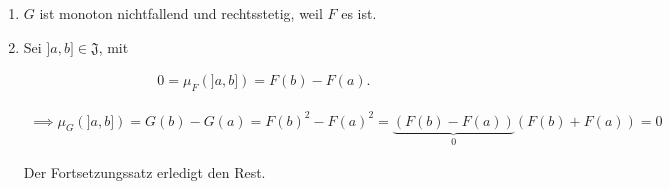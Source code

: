 \begin{solution}

\phantom{}

\begin{enumerate}[label = (\alph*)]

    \item $G$ ist monoton nichtfallend und rechtsstetig, weil $F$ es ist.
    
    \item Sei $]a, b] \in \mathfrak J$, mit
    
    \begin{align*}
        0 = \mu_F(]a, b]) = F(b) - F(a).
    \end{align*}

    \begin{align*}
        \implies
        \mu_G(]a, b])
        =
        G(b) - G(a)
        =
        F(b)^2 - F(a)^2
        =
        \underbrace{(F(b) - F(a))}_0 (F(b) + F(a))
        =
        0
    \end{align*}

    Der Fortsetzungssatz erledigt den Rest.
    
    \begin{comment}

        \item Sei $A \in \mathfrak B$ mit $\mu_F(A) = 0$.
        $\mu_F$ ist ein Lebesgue-Stieltjes-Maß, also sigmaendlich.

        \begin{align*}
            \implies &
            \mu_F(A)
            =
            \inf \Bbraces{\sum_{n \in \N} \mu_F(E_n): E_n \in \mathfrak J, A \subseteq \bigcup_{n \in \N} E_n} \\
            \implies &
            \Forall \epsilon > 0:
                \Exists (]a_n, b_n[) \subset \mathfrak J:
                    \sum_{n \in \N} ]a_n, b_n[ \supseteq A,
                    \quad
                    \mu_F \pbraces{\sum_{n \in \N} ]a_n, b_n[} \leq \underbrace{\mu_F(A)}_0 + \epsilon
        \end{align*}

        Sei $K \subseteq A$ kompakt.
        Laut dem Satz von Heine-Borel, gilt also

        \begin{align*}
            \Exists N \in \N:
                \sum_{n=1}^N:
                    ]a_n, b_n[ \supseteq K.
        \end{align*}

        \begin{align*}
            \implies
            \mu_G(K)
            \leq
            \mu_G \pbraces{\sum_{n=1}^N ]a_n, b_n[}
            \leq
            \sum_{n=1}^N
                \mu_G(]a_n, b_n[)
            \leq
            \sum_{n=1}^N
                \mu_G(]a_n, b_n])
            =
            \sum_{n=1}^N
                F(b_n)^2 - F(a_n)^2
            =
            \sum_{n=1}^N
                (F(b_n) - F(a_n)) (F(b_n) + F(a_n))
            \leq
            M \sum_{n=1}^N \mu_F(]a_n, b_n[)
            \leq
            M \cdot \epsilon
        \end{align*}


\end{comment}
\end{enumerate}
\end{solution}
